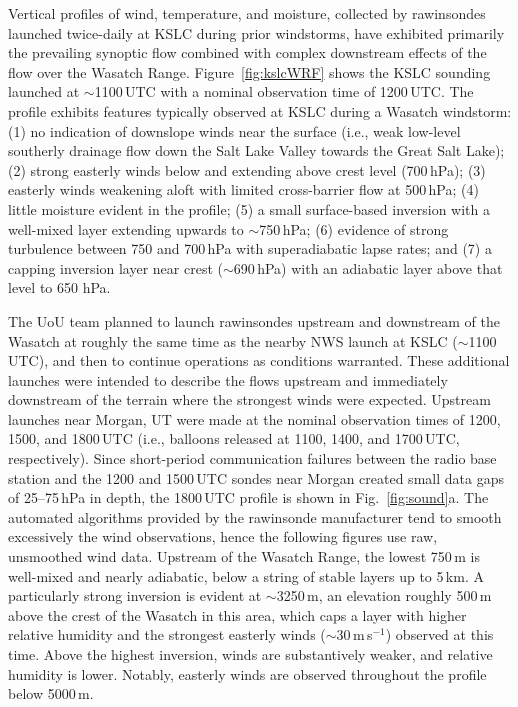 \documentclass[pdftex,12pt]{article}
\def\mps{m\,s$^{-1}$}
\def\around{$\sim$}
\begin{document}
Vertical profiles of wind, temperature, and moisture, collected by rawinsondes launched twice-daily at KSLC during prior windstorms, have exhibited primarily the prevailing synoptic flow combined with complex downstream effects of the flow over the Wasatch Range. Figure~\ref{fig:kslcWRF} shows the KSLC sounding launched at \around 1100\,UTC with a nominal observation time of 1200\,UTC. The profile exhibits features typically observed at KSLC during a Wasatch windstorm: (1) no indication of downslope winds near the surface (i.e., weak low-level southerly drainage flow down the Salt Lake Valley towards the Great Salt Lake); (2) strong easterly winds below and extending above crest level (700\,hPa); (3) easterly winds weakening aloft with limited cross-barrier flow at 500\,hPa; (4) little moisture evident in the profile; (5) a small surface-based inversion with a well-mixed layer extending upwards to \around 750\,hPa; (6) evidence of strong turbulence between 750 and 700\,hPa with superadiabatic lapse rates; and (7) a capping inversion layer near crest (\around 690\,hPa) with an adiabatic layer above that level to 650 hPa.

The UoU team planned to launch rawinsondes upstream and downstream of the Wasatch at roughly the same time as the nearby NWS launch at KSLC (\around 1100\,UTC), and then to continue operations as conditions warranted. These additional launches were intended to describe the flows upstream and immediately downstream of the terrain where the strongest winds were expected. Upstream launches near Morgan, UT were made at the nominal observation times of 1200, 1500, and 1800\,UTC (i.e., balloons released at 1100, 1400, and 1700\,UTC, respectively). Since short-period communication failures between the radio base station and the 1200 and 1500\,UTC sondes near Morgan created small data gaps of 25--75\,hPa in depth, the 1800\,UTC profile is shown in Fig.~\ref{fig:sound}a. The automated algorithms provided by the rawinsonde manufacturer tend to smooth excessively the wind observations, hence the following figures use raw, unsmoothed wind data. Upstream of the Wasatch Range, the lowest 750\,m is well-mixed and nearly adiabatic, below a string of stable layers up to 5\,km. A particularly strong inversion is evident at \around 3250\,m, an elevation roughly 500\,m above the crest of the Wasatch in this area, which caps a layer with higher relative humidity and the strongest easterly winds (\around 30\,\mps) observed at this time. Above the highest inversion, winds are substantively weaker, and relative humidity is lower. Notably, easterly winds are observed throughout the profile below 5000\,m.
\end{document}
